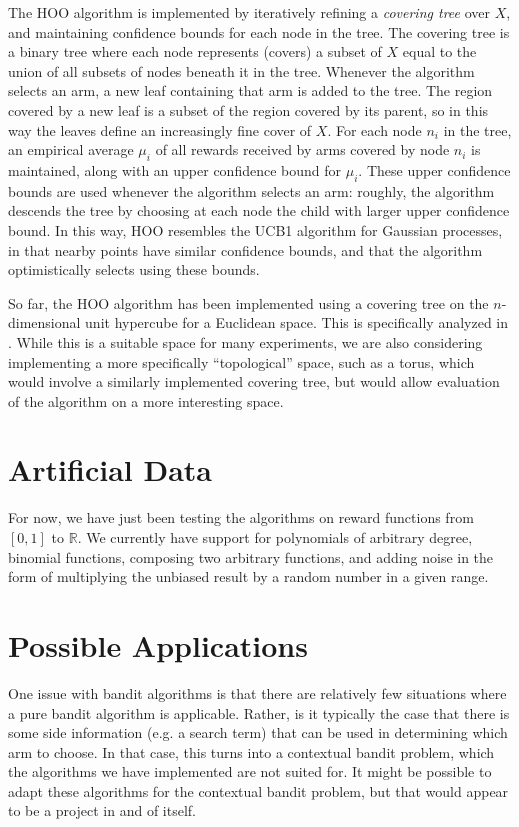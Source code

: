 \documentclass{article}
\begin{document}
The HOO algorithm is implemented by iteratively refining a
\emph{covering tree} over $X$, and maintaining confidence bounds
for each node in the tree. The covering tree is a binary tree where
each node represents (covers) a subset of $X$ equal to the union of
all subsets of nodes beneath it in the tree. Whenever the algorithm
selects an arm, a new leaf containing that arm is added to the
tree. The region covered by a new leaf is a subset of the region
covered by its parent, so in this way the leaves define an increasingly
fine cover of $X$. For each node $n_i$ in the tree, an empirical
average $\mu_i$ of all rewards received by arms covered by node $n_i$
is maintained, along with an upper confidence bound for
$\mu_i$. These upper confidence bounds are used whenever the algorithm
selects an arm: roughly, the algorithm descends the tree by choosing
at each node the child with larger upper confidence bound. In this
way, HOO resembles the UCB1 algorithm for Gaussian processes, in that
nearby points have similar confidence bounds, and that the algorithm
optimistically selects using these bounds.

So far, the HOO algorithm has been implemented using a covering tree
on the $n$-dimensional unit hypercube for a Euclidean space. This is
specifically analyzed in \cite{xArmed}. While this is a suitable space
for many experiments, we are also considering implementing a more
specifically ``topological'' space, such as a torus, which would
involve a similarly implemented covering tree, but would allow
evaluation of the algorithm on a more interesting space.  \\
\section{Artificial Data}
For now, we have just been testing the algorithms on reward functions from
$[0,1]$ to $\mathbb{R}$.  We currently have support for polynomials
of arbitrary degree, binomial functions, composing two arbitrary functions,
and adding noise in the form of multiplying the unbiased result by a random
number in a given range.

\section{Possible Applications}
One issue with bandit algorithms is that there are relatively few
situations where a pure bandit algorithm is applicable.  Rather, is it
typically the case that there is some side information (e.g. a search
term) that can be used in determining which arm to choose.  In that
case, this turns into a contextual bandit problem, which the
algorithms we have implemented are not suited for.  It might be
possible to adapt these algorithms for the contextual bandit problem,
but that would appear to be a project in and of itself.  \\
\\
\end{document}
